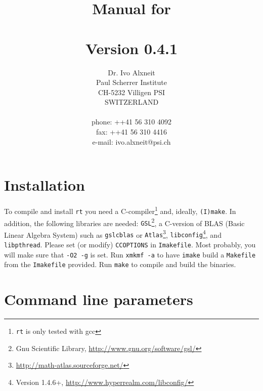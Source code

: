 \documentclass[10pt,a4paper,titlepage]{article}
\title{ {\Huge Manual for \\
		\rt \\
		Version 0.4.1\\
		\vspace{2cm}}}
\author{Dr. Ivo Alxneit \\
	Paul Scherrer Institute \\
	CH-5232 Villigen PSI \\
	SWITZERLAND \\
	\\
	phone: ++41 56 310 4092 \\
	fax: ++41 56 310 4416 \\
	e-mail: ivo.alxneit@psi.ch \\
	\vspace{4cm}}
\newcommand{\rt}{{\tt rt} }
\begin{document}
\maketitle

\tableofcontents
\pagebreak

\setcounter{page}{1}



\section{Installation}

To compile and install \rt you need a C-compiler\footnote{\rt is only tested with gcc} and, ideally, {\tt (I)make}. In addition, the following libraries are needed: {\tt GSL}\footnote{Gnu Scientific Library, \url{http://www.gnu.org/software/gsl/}}, a C-version of BLAS (Basic Linear Algebra System) such as {\tt gslcblas} or {\tt Atlas}\footnote{\url{http://math-atlas.sourceforge.net/}}, {\tt libconfig}\footnote{Version 1.4.6+, \url{http://www.hyperrealm.com/libconfig/}}, and {\tt libpthread}. Please set (or modify) {\tt CCOPTIONS} in {\tt Imakefile}. Most probably, you will make sure that {\tt -O2 -g} is set. Run {\tt xmkmf -a} to have {\tt imake} build a {\tt Makefile} from the {\tt Imakefile} provided. Run {\tt make} to compile and build the binaries.



\section{Command line parameters}
\end{document}
